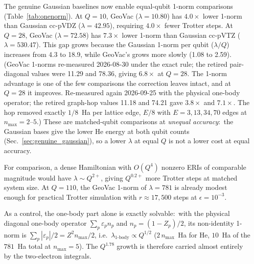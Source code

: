 \documentclass[aps,pra,twocolumn,superscriptaddress,longbibliography]{revtex4-2}
\newcommand{\gvq}[2]{#2}
\begin{document}
The genuine Gaussian baselines now enable equal-qubit 1-norm
comparisons (Table~\ref{tab:onenorm}).  At $Q = 10$, GeoVac
($\lambda = \gvq{he_n2_lambda}{10.80}$) has $4.0\times$ lower 1-norm than Gaussian
cc-pVDZ ($\lambda = 42.95$), requiring $4.0\times$ fewer Trotter
steps.  At $Q = 28$, GeoVac ($\lambda = \gvq{he_n3_lambda}{72.58}$) has $7.3\times$
lower 1-norm than Gaussian cc-pVTZ ($\lambda = 530.47$).  This
gap grows because the Gaussian 1-norm per qubit ($\lambda/Q$)
increases from 4.3 to 18.9, while GeoVac's grows more slowly (1.08 to
2.59).  (GeoVac 1-norms re-measured 2026-08-30 under the exact rule;
the retired pair-diagonal values were 11.29 and 78.36, giving
$6.8\times$ at $Q=28$.  The 1-norm advantage is one of the few
comparisons the correction leaves intact, and at $Q=28$ it improves.
Re-measured again 2026-09-25 with the physical one-body operator; the
retired graph-hop values 11.18 and 74.21 gave $3.8\times$ and $7.1\times$.
The hop removed exactly $1/8$~Ha per lattice edge, $E/8$ with
$E = 3, 13, 34, 70$ edges at $n_{\max} = 2$--$5$.)
These are matched-qubit comparisons at \emph{unequal accuracy}:\ the
Gaussian bases give the lower He energy at both qubit counts
(Sec.~\ref{sec:genuine_gaussian}), so a lower $\lambda$ at equal $Q$ is
not a lower cost at equal accuracy.

For comparison, a dense Hamiltonian with $O(Q^4)$ nonzero ERIs of
comparable magnitude would have $\lambda \sim Q^{2+}$, giving
$Q^{0.2+}$ more Trotter steps at matched system size.  At
$Q = 110$, the GeoVac 1-norm of $\lambda = \gvq{he_n5_lambda}{781}$ is already modest
enough for practical Trotter simulation with $r \approx 17{,}500$
steps at $\epsilon = 10^{-3}$.

As a control, the one-body part alone is exactly solvable:\ with the
physical diagonal one-body operator $\sum_p \varepsilon_p n_p$ and
$n_p = (1 - Z_p)/2$, its non-identity 1-norm is
$\sum_p |\varepsilon_p|/2 = Z^2 n_{\max}/2$, i.e.\ $\lambda_{\text{1-body}}
\propto Q^{1/2}$ ($2\,n_{\max}$~Ha for He, $10$~Ha of the $781$~Ha total
at $n_{\max} = 5$).  The $Q^{1.78}$ growth is therefore carried almost
entirely by the two-electron integrals.
\end{document}
